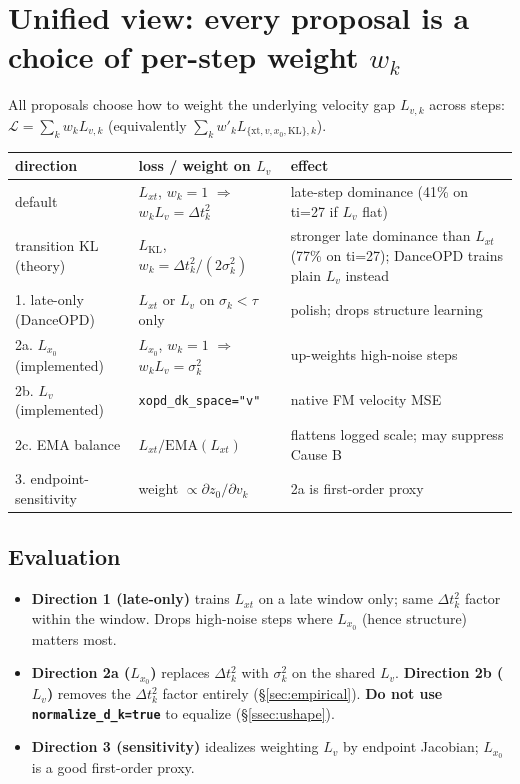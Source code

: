 \documentclass[11pt,a4paper]{article}
\newcommand{\dt}{\Delta t}
\begin{document}
\section{Unified view: every proposal is a choice of per-step weight $w_k$}
\label{sec:unified}

All proposals choose how to weight the underlying velocity gap $L_{v,k}$ across steps:
$\mathcal{L}=\sum_k w_k L_{v,k}$ (equivalently $\sum_k w'_k L_{\{\mathrm{xt},v,x_0,\mathrm{KL}\},k}$).

\begin{center}
\renewcommand{\arraystretch}{1.3}
\footnotesize
\begin{tabular}{@{}p{3.6cm}p{4.5cm}p{5.0cm}@{}}
\toprule
\textbf{direction} & \textbf{loss / weight on $L_v$} & \textbf{effect} \\
\midrule
default & $L_{xt}$, $w_k=1$ $\Rightarrow$ $w_k L_v=\dt_k^2$ & late-step dominance (41\% on ti=27 if $L_v$ flat) \\
transition KL (theory) & $L_{\mathrm{KL}}$, $w_k=\dt_k^2/(2\sigma_k^2)$ & stronger late dominance than $L_{xt}$ (77\% on ti=27); DanceOPD trains plain $L_v$ instead \\
1. late-only (DanceOPD) & $L_{xt}$ or $L_v$ on $\sigma_k<\tau$ only & polish; drops structure learning \\
2a. $L_{x_0}$ (implemented) & $L_{x_0}$, $w_k=1$ $\Rightarrow$ $w_k L_v=\sigma_k^2$ & up-weights high-noise steps \\
2b. $L_v$ (implemented) & \texttt{xopd\_dk\_space="v"} & native FM velocity MSE \\
2c. EMA balance & $L_{xt} / \mathrm{EMA}(L_{xt})$ & flattens logged scale; may suppress Cause B \\
3. endpoint-sensitivity & weight $\propto\partial z_0/\partial v_k$ & 2a is first-order proxy \\
\bottomrule
\end{tabular}
\end{center}

\subsection{Evaluation}
\label{ssec:eval}

\begin{itemize}[leftmargin=1.5em]
\item \textbf{Direction 1 (late-only)} trains $L_{xt}$ on a late window only; same $\dt_k^2$ factor
within the window. Drops high-noise steps where $L_{x_0}$ (hence structure) matters most.
\item \textbf{Direction 2a ($L_{x_0}$)} replaces $\dt_k^2$ with $\sigma_k^2$ on the shared $L_v$.
\textbf{Direction 2b ($L_v$)} removes the $\dt_k^2$ factor entirely (\S\ref{sec:empirical}).
\textbf{Do not use \texttt{normalize\_d\_k=true}} to equalize (\S\ref{ssec:ushape}).
\item \textbf{Direction 3 (sensitivity)} idealizes weighting $L_v$ by endpoint Jacobian; $L_{x_0}$
is a good first-order proxy.
\end{itemize}
\end{document}
